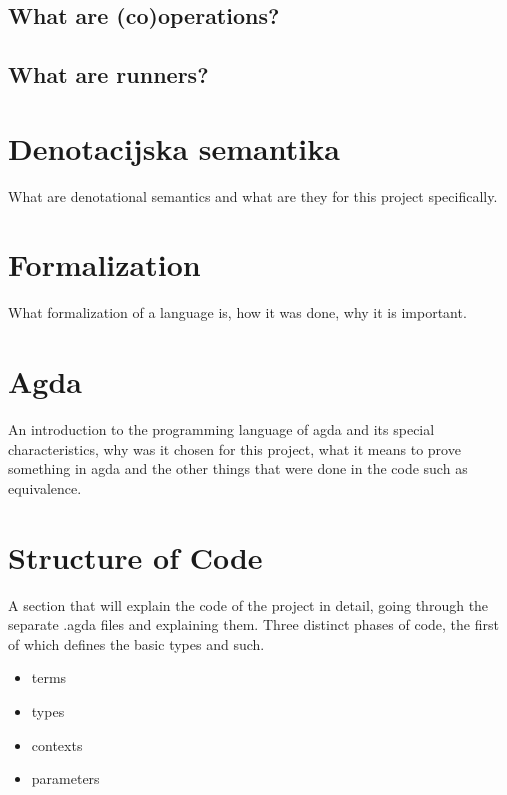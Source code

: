 \documentclass[11pt]{article} %
\begin{document}
\subsection{What are (co)operations?}

\subsection{What are runners?}%


\section{Denotacijska semantika}
What are denotational semantics and what are they for this project specifically.



\section{Formalization}%
What formalization of a language is, how it was done, why it is important.


\section{Agda}
An introduction to the programming language of agda and its special characteristics, why was it chosen for this project, what it means to prove something in agda and the other things that were done in the code such as equivalence.

\section{Structure of Code}%
A section that will explain the code of the project in detail, going through the separate .agda files and explaining them.
Three distinct phases of code, the first of which defines the basic types and such.
\begin{itemize}
	\item terms 
	\item types
	\item contexts
	\item parameters
\end{itemize}
\end{document}
